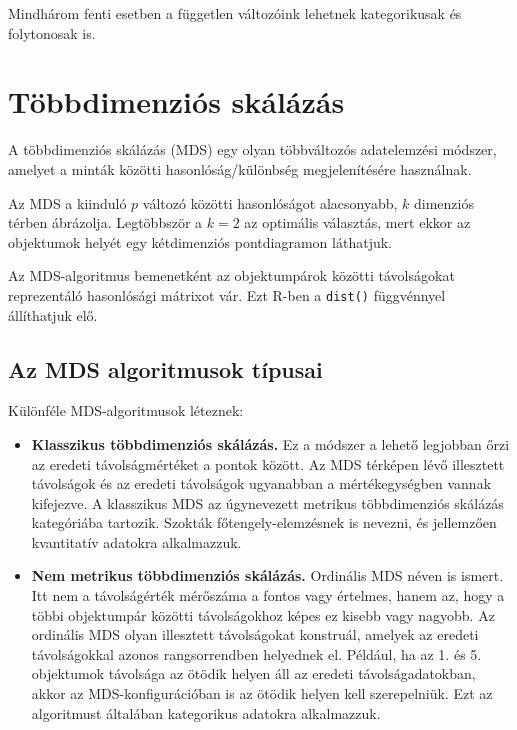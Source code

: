 \documentclass[
  letterpaper,
]{krantz}
\begin{document}
Mindhárom fenti esetben a független változóink lehetnek kategorikusak és
folytonosak is.


\hypertarget{sec-tobbdimenzios-skalazas}{%
\chapter{Többdimenziós skálázás}\label{sec-tobbdimenzios-skalazas}}

A többdimenziós skálázás (MDS) egy olyan többváltozós adatelemzési
módszer, amelyet a minták közötti hasonlóság/különbség megjelenítésére
használnak.

Az MDS a kiinduló \(p\) változó közötti hasonlóságot alacsonyabb, \(k\)
dimenziós térben ábrázolja. Legtöbbször a \(k = 2\) az optimális
választás, mert ekkor az objektumok helyét egy kétdimenziós
pontdiagramon láthatjuk.

Az MDS-algoritmus bemenetként az objektumpárok közötti távolságokat
reprezentáló hasonlósági mátrixot vár. Ezt R-ben a \texttt{dist()}
függvénnyel állíthatjuk elő.

\hypertarget{az-mds-algoritmusok-tuxedpusai}{%
\section{Az MDS algoritmusok
típusai}\label{az-mds-algoritmusok-tuxedpusai}}

Különféle MDS-algoritmusok léteznek:

\begin{itemize}
\item
  \textbf{Klasszikus többdimenziós skálázás.} Ez a módszer a lehető
  legjobban őrzi az eredeti távolságmértéket a pontok között. Az MDS
  térképen lévő illesztett távolságok és az eredeti távolságok
  ugyanabban a mértékegységben vannak kifejezve. A klasszikus MDS az
  úgynevezett metrikus többdimenziós skálázás kategóriába tartozik.
  Szokták főtengely-elemzésnek is nevezni, és jellemzően kvantitatív
  adatokra alkalmazzuk.
\item
  \textbf{Nem metrikus többdimenziós skálázás.} Ordinális MDS néven is
  ismert. Itt nem a távolságérték mérőszáma a fontos vagy értelmes,
  hanem az, hogy a többi objektumpár közötti távolságokhoz képes ez
  kisebb vagy nagyobb. Az ordinális MDS olyan illesztett távolságokat
  konstruál, amelyek az eredeti távolságokkal azonos rangsorrendben
  helyednek el. Például, ha az 1. és 5. objektumok távolsága az ötödik
  helyen áll az eredeti távolságadatokban, akkor az MDS-konfigurációban
  is az ötödik helyen kell szerepelniük. Ezt az algoritmust általában
  kategorikus adatokra alkalmazzuk.
\end{itemize}
\end{document}
